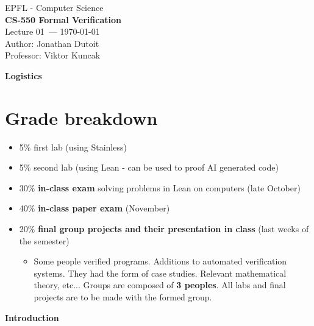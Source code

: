 \documentclass[11pt]{article}
\newcommand{\coursename}{CS-550 Formal Verification}
\newcommand{\lecturenum}{01}
\newcommand{\lecturedate}{\today}
\newcommand{\professor}{Viktor Kuncak}
\begin{document}
\begin{center}
  {\large EPFL - Computer Science} \\[0.5em]
  {\Large \textbf{\coursename}} \\[0.5em]
  {\large Lecture \lecturenum\ --- \lecturedate} \\[0.5em]
  {\large Author: Jonathan Dutoit} \\[0.5em]
  {\large Professor: \professor} \\[0.5em]
\end{center}

\vspace{2cm}

\vspace{0.5cm}

\begin{center}
  {\LARGE \textbf{Logistics}}
\end{center}
\vspace{0.5cm}
\section*{Grade breakdown}
\begin{itemize}
	\item 5$\%$ first lab (using Stainless) 
	\item 5$\%$ second lab (using Lean - can be used to proof AI generated code)
	\item 30$\%$ \textbf{in-class exam} solving problems in Lean on computers (late October)
	\item 40$\%$ \textbf{in-class paper exam} (November)
	\item 20$\%$ \textbf{final group projects and their presentation in class} (last weeks of the semester)
		\begin{itemize}
			\item Some people verified programs. Additions to automated verification systems. They had the form of case studies. Relevant mathematical theory, etc... Groups are composed of \textbf{3 peoples}. All labs and final projects are to be made with the formed group. 
		\end{itemize}
\end{itemize}

\vspace{1cm}

\begin{center}
  {\LARGE \textbf{Introduction}}
\end{center}
\vspace{0.5cm}
\end{document}
